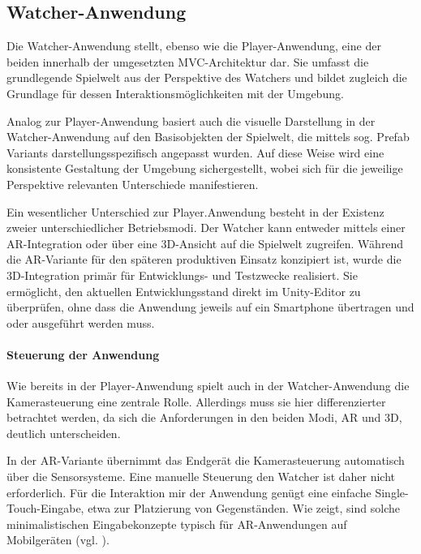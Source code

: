 \subsection{Watcher-Anwendung}

Die Watcher-Anwendung stellt, ebenso wie die Player-Anwendung, eine der beiden  innerhalb der umgesetzten \ac{MVC}-Architektur dar. Sie umfasst die grundlegende Spielwelt aus der Perspektive des Watchers und bildet zugleich die Grundlage für dessen Interaktionsmöglichkeiten mit der Umgebung.

Analog zur Player-Anwendung basiert auch die visuelle Darstellung in der Watcher-Anwendung auf den Basisobjekten der Spielwelt, die mittels sog. Prefab Variants darstellungsspezifisch angepasst wurden. Auf diese Weise wird eine konsistente Gestaltung der Umgebung sichergestellt, wobei sich für die jeweilige Perspektive relevanten Unterschiede manifestieren.

Ein wesentlicher Unterschied zur Player.Anwendung besteht in der Existenz zweier unterschiedlicher Betriebsmodi. Der Watcher kann entweder mittels einer \ac{AR}-Integration oder über eine \ac{3D}-Ansicht auf die Spielwelt zugreifen. Während die \ac{AR}-Variante für den späteren produktiven Einsatz konzipiert ist, wurde die \ac{3D}-Integration primär für Entwicklungs- und Testzwecke realisiert. Sie ermöglicht, den aktuellen Entwicklungsstand direkt im Unity-Editor zu überprüfen, ohne dass die Anwendung jeweils auf ein Smartphone übertragen und oder ausgeführt werden muss.

\paragraph{Steuerung der Anwendung}

Wie bereits in der Player-Anwendung spielt auch in der Watcher-Anwendung die Kamerasteuerung eine zentrale Rolle. Allerdings muss sie hier differenzierter betrachtet werden, da sich die Anforderungen in den beiden Modi, \ac{AR} und \ac{3D}, deutlich unterscheiden.

In der \ac{AR}-Variante übernimmt das Endgerät die Kamerasteuerung automatisch über die Sensorsysteme. Eine manuelle Steuerung den Watcher ist daher nicht erforderlich. Für die Interaktion mir der Anwendung genügt eine einfache Single-Touch-Eingabe, etwa zur Platzierung von Gegenständen. Wie \cite{reinhard_augmented_2022} zeigt, sind solche minimalistischen Eingabekonzepte typisch für \ac{AR}-Anwendungen auf Mobilgeräten (vgl. \citealp[S. 66ff]{reinhard_augmented_2022}).

